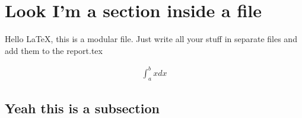 \section{Look I'm a section inside a file}

Hello \LaTeX, this is a modular file.
Just write all your stuff in separate files and add them 
to the report.tex

\begin{gather}
    \int_a^b x dx
\end{gather}

\subsection{Yeah this is a subsection}